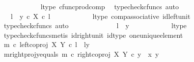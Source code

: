 \begin{isabellebody}
\ \ \ \ \ \ \ \ \ \ \isamarkupfalse%
\ l{\isacharunderscore}{\kern0pt}type\ cfunc{\isacharunderscore}{\kern0pt}prod{\isacharunderscore}{\kern0pt}comp\ \isamarkupfalse%
\ {\isacharparenleft}{\kern0pt}typecheck{\isacharunderscore}{\kern0pt}cfuncs{\isacharcomma}{\kern0pt}\ auto{\isacharparenright}{\kern0pt}\isanewline
\ \ \ \ \ \ \ \ \isamarkupfalse%
\ \isamarkupfalse%
\ {\isachardoublequoteopen}{\isachardot}{\kern0pt}{\isachardot}{\kern0pt}{\isachardot}{\kern0pt}\ {\isacharequal}{\kern0pt}\ {\isasymlangle}l\ {\isacharcomma}{\kern0pt}\ y{}\ {\isasymcirc}\isactrlsub c\ {\isasymbeta}\isactrlbsub X\isactrlesub \ {\isasymcirc}\isactrlsub c\ l{\isasymrangle}{\isachardoublequoteclose}\isanewline
\ \ \ \ \ \ \ \ \ \ \isamarkupfalse%
\ l{\isacharunderscore}{\kern0pt}type\ comp{\isacharunderscore}{\kern0pt}associative{}\ id{\isacharunderscore}{\kern0pt}left{\isacharunderscore}{\kern0pt}unit{}\ \isamarkupfalse%
\ {\isacharparenleft}{\kern0pt}typecheck{\isacharunderscore}{\kern0pt}cfuncs{\isacharcomma}{\kern0pt}\ auto{\isacharparenright}{\kern0pt}\isanewline
\ \ \ \ \ \ \ \ \isamarkupfalse%
\ \isamarkupfalse%
\ {\isachardoublequoteopen}{\isachardot}{\kern0pt}{\isachardot}{\kern0pt}{\isachardot}{\kern0pt}\ {\isacharequal}{\kern0pt}\ {\isasymlangle}l\ {\isacharcomma}{\kern0pt}\ y{}{\isasymrangle}{\isachardoublequoteclose}\isanewline
\ \ \ \ \ \ \ \ \ \ \isamarkupfalse%
\ l{\isacharunderscore}{\kern0pt}type\ \isamarkupfalse%
\ {\isacharparenleft}{\kern0pt}typecheck{\isacharunderscore}{\kern0pt}cfuncs{\isacharcomma}{\kern0pt}metis\ id{\isacharunderscore}{\kern0pt}right{\isacharunderscore}{\kern0pt}unit{}\ id{\isacharunderscore}{\kern0pt}type\ one{\isacharunderscore}{\kern0pt}unique{\isacharunderscore}{\kern0pt}element{\isacharparenright}{\kern0pt}\isanewline
\ \ \ \ \ \ \ \ \isamarkupfalse%
\ \isamarkupfalse%
\ {\isachardoublequoteopen}m\ {\isasymcirc}\isactrlsub c\ left{\isacharunderscore}{\kern0pt}coproj\ X\ Y\ {\isasymcirc}\isactrlsub c\ l\ {\isacharequal}{\kern0pt}\ {\isasymlangle}l{\isacharcomma}{\kern0pt}y{}{\isasymrangle}{\isachardoublequoteclose}\isacommand{{\isachardot}{\kern0pt}}\isamarkupfalse%
\isanewline
\ \ \ \ \ \ \isamarkupfalse%
\isanewline
\isanewline
\ \ \ \ \ \ \isamarkupfalse%
\ m{\isacharunderscore}{\kern0pt}rightproj{\isacharunderscore}{\kern0pt}y{}{\isacharunderscore}{\kern0pt}equals{\isacharcolon}{\kern0pt}\ {\isachardoublequoteopen}m\ {\isasymcirc}\isactrlsub c\ right{\isacharunderscore}{\kern0pt}coproj\ X\ Y\ {\isasymcirc}\isactrlsub c\ y{}\ {\isacharequal}{\kern0pt}\ {\isasymlangle}x{}{\isacharcomma}{\kern0pt}\ y{}{\isasymrangle}{\isachardoublequoteclose}\isanewline

\end{isabellebody}
